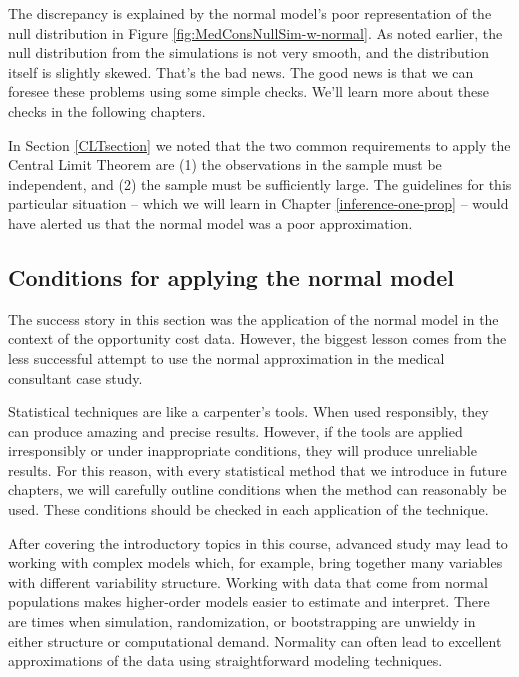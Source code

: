 \documentclass[
  10pt,
  openany]{book}
\begin{document}
The discrepancy is explained by the normal model's poor representation of the null distribution in Figure \ref{fig:MedConsNullSim-w-normal}.
As noted earlier, the null distribution from the simulations is not very smooth, and the distribution itself is slightly skewed.
That's the bad news.
The good news is that we can foresee these problems using some simple checks.
We'll learn more about these checks in the following chapters.

In Section \ref{CLTsection} we noted that the two common requirements to apply the Central Limit Theorem are (1) the observations in the sample must be independent, and (2) the sample must be sufficiently large.
The guidelines for this particular situation -- which we will learn in Chapter \ref{inference-one-prop} -- would have alerted us that the normal model was a poor approximation.

\hypertarget{conditions-for-applying-the-normal-model}{%
\subsection{Conditions for applying the normal model}\label{conditions-for-applying-the-normal-model}}

The success story in this section was the application of the normal model in the context of the opportunity cost data.
However, the biggest lesson comes from the less successful attempt to use the normal approximation in the medical consultant case study.

Statistical techniques are like a carpenter's tools.
When used responsibly, they can produce amazing and precise results.
However, if the tools are applied irresponsibly or under inappropriate conditions, they will produce unreliable results.
For this reason, with every statistical method that we introduce in future chapters, we will carefully outline conditions when the method can reasonably be used.
These conditions should be checked in each application of the technique.

After covering the introductory topics in this course, advanced study may lead to working with complex models which, for example, bring together many variables with different variability structure.
Working with data that come from normal populations makes higher-order models easier to estimate and interpret.
There are times when simulation, randomization, or bootstrapping are unwieldy in either structure or computational demand.
Normality can often lead to excellent approximations of the data using straightforward modeling techniques.
\end{document}
